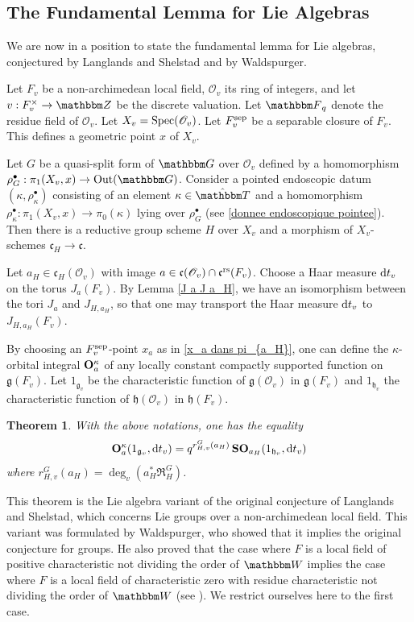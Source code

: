 \documentclass[12pt,english]{smfart}
\numberwithin{equation}{subsection}
\newtheorem{theoreme}[equation]{Theorem}
\theoremstyle{remark}
\newcommand\calO{{\mathscr O}}
\newcommand\frakg{{\mathfrak g}}
\newcommand\frakc{{\mathfrak c}}
\newcommand\GG{{\mathbbm G}}
\newcommand\FF{{\mathbbm F}}
\newcommand\ZZ{{\mathbbm Z}}
\newcommand\bbW{{\mathbbm W}}
\newcommand\bbT{{\mathbbm T}}
\newcommand\frakh{\mathfrak h}
\newcommand\Spec{{\rm Spec}}
\newcommand\Out{{\rm Out}}
\newcommand\rs{{\rm rs}}
\newcommand\resultant{\mathfrak R}
\begin{document}
\subsection{The Fundamental Lemma for Lie Algebras}

We are now in a position to state the fundamental lemma for Lie algebras, conjectured by Langlands and Shelstad and by Waldspurger.

Let $F_v$ be a non-archimedean local field, $\calO_v$ its ring of integers, and let $v:F_v^\times\rightarrow \ZZ$ be the discrete valuation. Let $\FF_q$ denote the residue field of $\calO_v$. Let $X_v=\Spec(\calO_v)$. Let $F_v^{\rm sep}$ be a separable closure of $F_v$. This defines a geometric point $x$ of $X_v$.

Let $G$ be a quasi-split form of $\GG$ over $\calO_v$ defined by a homomorphism $\rho_G^\bullet:\pi_1(X_v,x)\rightarrow \Out(\GG)$. Consider a pointed endoscopic datum
$(\kappa,\rho_\kappa^\bullet)$ consisting of an element $\kappa\in\hat\bbT$ and a homomorphism $\rho_\kappa^\bullet:\pi_1(X_v,x)\rightarrow \pi_0(\kappa)$ lying over $\rho_G^\bullet$ (see \ref{donnee endoscopique pointee}). Then there is a reductive group scheme $H$ over $X_v$ and a morphism of $X_v$-schemes $\frakc_H\rightarrow \frakc$.

Let $a_H\in\frakc_H(\calO_v)$ with image $a\in\frakc(\calO_v)\cap \frakc^\rs(F_v)$. Choose a Haar measure ${\rm d}t_v$ on the torus $J_a(F_v)$. By Lemma \ref{J a J a_H}, we have an isomorphism between the tori $J_a$ and $J_{H,a_H}$, so that one may transport the Haar measure ${\rm d}t_v$ to $J_{H,a_H}(F_v)$.

By choosing an $F_v^{\rm sep}$-point $x_a$ as in \ref{x_a dans pi_{a_H}}, one can define the $\kappa$-orbital integral ${\bf O}_a^\kappa$ of any locally constant compactly supported function on $\frakg(F_v)$. Let $1_{\frakg_v}$ be the characteristic function of $\frakg(\calO_v)$ in $\frakg(F_v)$ and $1_{\frakh_v}$ the characteristic function of $\frakh(\calO_v)$ in $\frakh(F_v)$.

\begin{theoreme}\label{LS}
With the above notations, one has the equality
$$
{\bf O}_a^\kappa(1_{\frakg_v},{\rm d}t_v)=q^{r_{H,v}^G(a_H)}\,{\bf SO}_{a_H}(1_{\frakh_v},{\rm d}t_v)
$$
where $r_{H,v}^G(a_H)=\deg_v(a_H^* \resultant_H^G)$.
\end{theoreme}

This theorem is the Lie algebra variant of the original conjecture of Langlands and Shelstad, which concerns Lie groups over a non-archimedean local field. This variant was formulated by Waldspurger, who showed that it implies the original conjecture for groups. He also proved that the case where $F$ is a local field of positive characteristic not dividing the order of $\bbW$ implies the case where $F$ is a local field of characteristic zero with residue characteristic not dividing the order of $\bbW$ (see \cite{W}). We restrict ourselves here to the first case.
\end{document}
